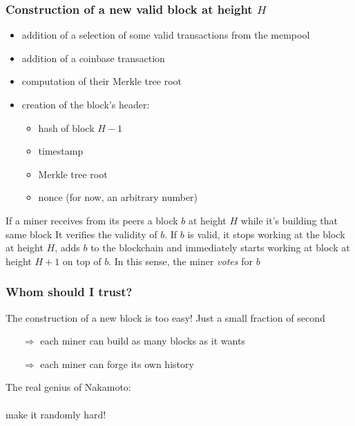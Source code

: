 \documentclass[11pt]{beamer}  %
\begin{document}
\begin{frame}\frametitle{Construction of a new valid block at height $H$}

    \begin{greenbox}{}
      \begin{itemize}
      \item addition of a selection of some valid transactions from the mempool
      \item addition of a coinbase transaction
      \item computation of their Merkle tree root
      \item creation of the block's header:
        \begin{itemize}
        \item hash of block $H-1$
        \item timestamp
        \item Merkle tree root
        \item nonce (for now, an arbitrary number)
        \end{itemize}
      \end{itemize}
    \end{greenbox}

    \bigskip

    \begin{greenbox}{If a miner receives from its peers a block $b$ at height $H$
        while it's building that same block}
      It verifies the validity of $b$. If $b$ is valid,
      it stops working at the block at height $H$, adds $b$ to the blockchain
      and immediately starts working at block at height $H+1$ on top of $b$. In this sense,
      the miner \emph{votes} for $b$
    \end{greenbox}

\end{frame}

\begin{frame}\frametitle{Whom should I trust?}

  \begin{redbox}{The construction of a new block is too easy!}
    Just a small fraction of second

    \begin{itemize}
    \item[$\Rightarrow$] each miner can build as many blocks as it wants
    \item[$\Rightarrow$] each miner can forge its own history
    \end{itemize}
  \end{redbox}

  \bigskip
  \bigskip

  \pause

  \begin{center}
    The real genius of Nakamoto:\\

    \mbox{}\\
    
    {\Huge make it randomly hard!}
  \end{center}

\end{frame}
\end{document}

